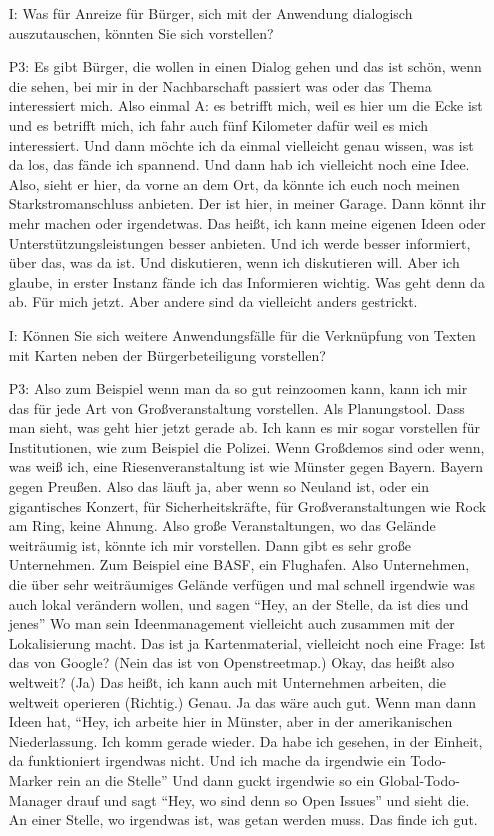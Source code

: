 \begin{itemize}
    \item[I:] Was f{\"u}r Anreize f{\"u}r B{\"u}rger, sich mit der Anwendung dialogisch auszutauschen, k{\"o}nnten Sie sich vorstellen?
    \item[P3:] Es gibt B{\"u}rger, die wollen in einen Dialog gehen und das ist sch{\"o}n, wenn die sehen, bei mir in der Nachbarschaft passiert was oder das Thema interessiert mich. Also einmal A: es betrifft mich, weil es hier um die Ecke ist und es betrifft mich, ich fahr auch f{\"u}nf Kilometer daf{\"u}r weil es mich interessiert. Und dann m{\"o}chte ich da einmal vielleicht genau wissen, was ist da los, das f{\"a}nde ich spannend. Und dann hab ich vielleicht noch eine Idee. Also, sieht er hier, da vorne an dem Ort, da k{\"o}nnte ich euch noch meinen Starkstromanschluss anbieten. Der ist hier, in meiner Garage. Dann k{\"o}nnt ihr mehr machen oder irgendetwas. Das hei{\ss}t, ich kann meine eigenen Ideen oder Unterst{\"u}tzungsleistungen besser anbieten. Und ich werde besser informiert, {\"u}ber das, was da ist. Und diskutieren, wenn ich diskutieren will. Aber ich glaube, in erster Instanz f{\"a}nde ich das Informieren wichtig. Was geht denn da ab. F{\"u}r mich jetzt. Aber andere sind da vielleicht anders gestrickt.
    \item[I:] K{\"o}nnen Sie sich weitere Anwendungsf{\"a}lle f{\"u}r die Verkn{\"u}pfung von Texten mit Karten neben der B{\"u}rgerbeteiligung vorstellen?
    \item[P3:] Also zum Beispiel wenn man da so gut reinzoomen kann, kann ich mir das f{\"u}r jede Art von Gro{\ss}veranstaltung vorstellen. Als Planungstool. Dass man sieht, was geht hier jetzt gerade ab. Ich kann es mir sogar vorstellen f{\"u}r Institutionen, wie zum Beispiel die Polizei. Wenn Gro{\ss}demos sind oder wenn, was wei{\ss} ich, eine Riesenveranstaltung ist wie M{\"u}nster gegen Bayern. Bayern gegen Preu{\ss}en. Also das l{\"a}uft ja, aber wenn so Neuland ist, oder ein gigantisches Konzert, f{\"u}r Sicherheitskr{\"a}fte, f{\"u}r Gro{\ss}veranstaltungen wie Rock am Ring, keine Ahnung. Also gro{\ss}e Veranstaltungen, wo das Gel{\"a}nde weitr{\"a}umig ist, k{\"o}nnte ich mir vorstellen. Dann gibt es sehr gro{\ss}e Unternehmen. Zum Beispiel eine BASF, ein Flughafen. Also Unternehmen, die {\"u}ber sehr weitr{\"a}umiges Gel{\"a}nde verf{\"u}gen und mal schnell irgendwie was auch lokal ver{\"a}ndern wollen, und sagen "`Hey, an der Stelle, da ist dies und jenes"' Wo man sein Ideenmanagement vielleicht auch zusammen mit der Lokalisierung macht. Das ist ja Kartenmaterial, vielleicht noch eine Frage: Ist das von Google? (Nein das ist von Openstreetmap.) Okay, das hei{\ss}t also weltweit? (Ja) Das hei{\ss}t, ich kann auch mit Unternehmen arbeiten, die weltweit operieren (Richtig.) Genau. Ja das w{\"a}re auch gut. Wenn man dann Ideen hat, "`Hey, ich arbeite hier in M{\"u}nster, aber in der amerikanischen Niederlassung. Ich komm gerade wieder. Da habe ich gesehen, in der Einheit, da funktioniert irgendwas nicht. Und ich mache da irgendwie ein Todo-Marker rein an die Stelle"' Und dann guckt irgendwie so ein Global-Todo-Manager drauf und sagt "`Hey, wo sind denn so Open Issues"' und sieht die. An einer Stelle, wo irgendwas ist, was getan werden muss. Das finde ich gut.

\end{itemize}
